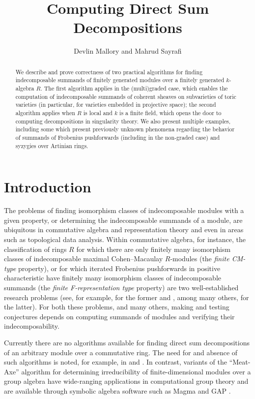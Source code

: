 \documentclass[12pt]{article}
\title{Computing Direct Sum Decompositions}
\author{Devlin Mallory and Mahrud Sayrafi}
\theoremstyle{theorem}
\numberwithin{thm}{section}
\theoremstyle{definition}
\begin{document}
\maketitle

\begin{abstract}
  We describe and prove correctness of two practical algorithms for finding indecomposable summands of finitely generated modules over a finitely generated $k$-algebra $R$. The first algorithm applies in the (multi)graded case, which enables the computation of indecomposable summands of coherent sheaves on subvarieties of toric varieties (in particular, for varieties embedded in projective space); the second algorithm applies when $R$ is local and $k$ is a finite field, which opens the door to computing decompositions in singularity theory. We also present multiple examples, including some which present previously unknown phenomena regarding the behavior of summands of Frobenius pushforwards (including in the non-graded case) and syzygies over Artinian rings.
\end{abstract}

\section{Introduction}

The problems of finding isomorphism classes of indecomposable modules with a given property, or determining the indecomposable summands of a module, are ubiquitous in commutative algebra and representation theory and even in areas such as topological data analysis. Within commutative algebra, for instance, the classification of rings $R$ for which there are only finitely many isomorphism classes of indecomposable maximal Cohen--Macaulay $R$-modules (the \emph{finite CM-type} property), or for which iterated Frobenius pushforwards in positive characteristic have finitely many isomorphism classes of indecomposable summands (the \emph{finite F-representation type} property) are two well-established research problems (see, for example, \cite{Yoshino90,LW12} for the former and \cite{SVdB97,Hara15,TT08}, among many others, for the latter). For both these problems, and many others, making and testing conjectures depends on computing summands of modules and verifying their indecomposability.

Currently there are no algorithms available for finding direct sum decompositions of an arbitrary module over a commutative ring. The need for and absence of such algorithms is noted, for example, in \cite[\S15.10.9]{Eisenbud95} and \cite[\S8.5]{BL23}. In contrast, variants of the ``Meat-Axe'' algorithm for determining irreducibility of finite-dimensional modules over a group algebra have wide-ranging applications in computational group theory \cite{Parker84,HR94,Holt98,IL00} and are available through symbolic algebra software such as Magma and GAP \cite{MAGMA,GAP}.
\end{document}
